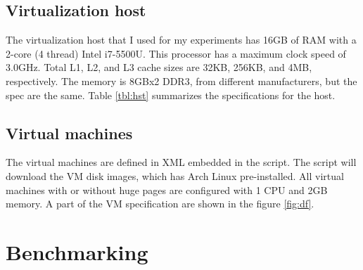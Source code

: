 \documentclass[12pt]{article}
\begin{document}
\subsection{Virtualization host}

The virtualization host that I used for my experiments has 16GB of RAM with a 2-core (4 thread) Intel i7-5500U. This processor has a maximum clock speed of 3.0GHz. Total L1, L2, and L3 cache sizes are 32KB, 256KB, and 4MB, respectively. The memory is 8GBx2 DDR3, from different manufacturers, but the spec are the same. Table \ref{tbl:hst} summarizes the specifications for the host.

\begin{table}[h]
	\centering \scriptsize {}
	\caption{Host Specs} \label{tbl:hst}
\end{table}

\subsection{Virtual machines}

The virtual machines are defined in XML embedded in the script. The script will download the VM disk images, which has Arch Linux pre-installed. All virtual machines with or without huge pages are configured with 1 CPU and 2GB memory. A part of the VM specification are shown in the figure \ref{fig:df}.

\section{Benchmarking}
\end{document}
